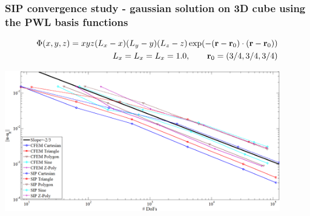 \documentclass[compress,10pt]{beamer}
\begin{document}

\begin{frame}[t]\frametitle{SIP convergence study - gaussian solution on 3D cube using the PWL basis functions}
\begin{block}{}
	\begin{equation*}
		\begin{aligned}
		\Phi(x,y,z) = x y z (L_x - x)  (L_y - y)  (L_z - z) \exp(-({\bf r} - {\bf r}_0) \cdot ({\bf r} - {\bf r}_0))\\
		L_x = L_x = L_x = 1.0 , \qquad {\bf r}_0 = (3/4,3/4,3/4)
		\end{aligned}
	\end{equation*}
\end{block}
\centering
\includegraphics[width=0.9\textwidth]{images/sip_gauss_full_paint.png} 
\end{frame}

\end{document}
